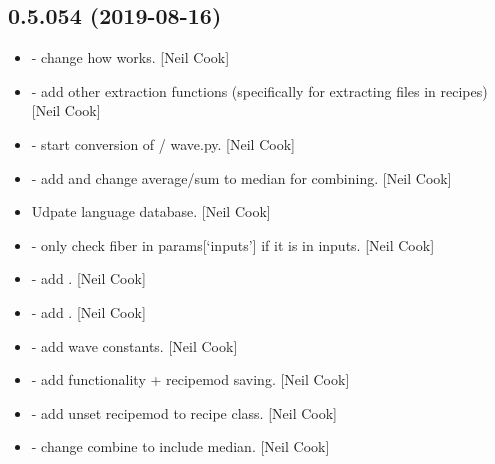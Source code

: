 \documentclass[a4paper,10pt,english]{report}
\begin{document}
\subsection{0.5.054 (2019-08-16)}
\label{\detokenize{misc/changelog:id89}}\begin{itemize}
\item {} 
 - change how  works.
{[}Neil Cook{]}

\item {} 
 - add other extraction functions
(specifically for extracting files in recipes) {[}Neil Cook{]}

\item {} 
 - start conversion of  /
wave.py. {[}Neil Cook{]}

\item {} 
 - add  and change average/sum to median
for combining. {[}Neil Cook{]}

\item {} 
Udpate language database. {[}Neil Cook{]}

\item {} 
 - only check fiber in params{[}‘inputs’{]} if it is in
inputs. {[}Neil Cook{]}

\item {} 
 - add . {[}Neil Cook{]}

\item {} 
 - add . {[}Neil Cook{]}

\item {} 
 - add wave constants. {[}Neil
Cook{]}

\item {} 
 - add  functionality + recipemod
saving. {[}Neil Cook{]}

\item {} 
 - add unset recipemod to recipe class. {[}Neil
Cook{]}

\item {} 
 - change combine to include median. {[}Neil Cook{]}


\end{itemize}
\end{document}
